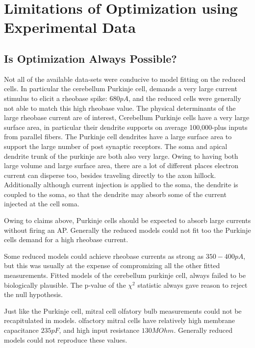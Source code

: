 
\section{Limitations of Optimization using Experimental Data}
\label{sec:limitations-of-optimization}

\subsection{Is Optimization Always Possible?}
Not all of the available data-sets were conducive to model fitting on the reduced cells. In particular the cerebellum Purkinje cell, demands a very large current stimulus to elicit a rheobase spike: $680pA$, and the reduced cells were generally not able to match this high rheobase value. The physical determinants of the large rheobase current are of interest, Cerebellum Purkinje cells have a very large surface area, in particular their dendrite supports on average 100,000-plus inputs from parallel fibers. The Purkinje cell dendrites have a large surface area to support the large number of post synaptic receptors. The soma and apical dendrite trunk of the purkinje are both also very large. Owing to having both large volume and large surface area, there are a lot of different places electron current can disperse too, besides traveling directly to the axon hillock. Additionally although current injection is applied to the soma, the dendrite is coupled to the soma, so that the dendrite may absorb some of the current injected at the cell soma. 

Owing to claims above, Purkinje cells should be expected to absorb large currents without firing an AP. Generally the reduced models could not fit too the Purkinje cells demand for a high rheobase current. 

Some reduced models could achieve rheobase currents as strong as $350-400pA$, but this was usually at the expense of compromizing all the other fitted measurements. Fitted models of the cerebellum purkinje cell, always failed to be biologically plausible. The p-value of the $\chi^{2}$ statistic always gave reason to reject the null hypothesis.

Just like the Purkinje cell, mitral cell olfatory bulb measurements could not be recapitulated in models. olfactory mitral cells have relatively high membrane capacitance $235pF$, and high input resistance $130MOhm$. Generally reduced models could not reproduce these values.  

